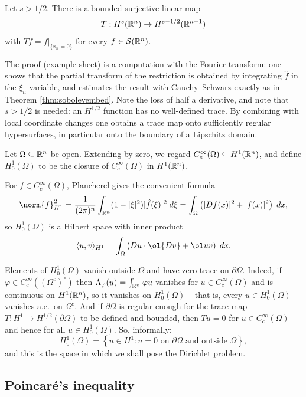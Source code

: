 \documentclass[a4paper]{scrartcl}
\newcommand{\ip}[2]{\langle #1, #2 \rangle}
\newcommand{\Sch}{\mathcal{S}}
\begin{document}
\begin{theorem}\label{thm:trace}
	Let $s>1/2$. There is a bounded surjective linear map
	$$T : H^s(\mathbb{R}^n)\to H^{s-1/2}(\mathbb{R}^{n-1})$$
	with $Tf = f|_{\{x_n=0\}}$ for every $f \in \Sch(\R^n)$.
\end{theorem}

The proof (example sheet) is a computation with the Fourier transform: one shows that the partial transform of the restriction is obtained by integrating $\hat f$ in the $\xi_n$ variable, and estimates the result with Cauchy--Schwarz exactly as in Theorem \ref{thm:sobolevembed}. Note the loss of half a derivative, and note that $s>1/2$ is needed: an $H^{1/2}$ function has no well-defined trace. By combining with local coordinate changes one obtains a trace map onto sufficiently regular hypersurfaces, in particular onto the boundary of a Lipschitz domain.

\begin{definition}
	Let $\Omega\subseteq\mathbb{R}^n$ be open. Extending by zero, we regard $C_c^\infty(\Omega)\subseteq H^1(\mathbb{R}^n)$, and define $H_0^1(\Omega)$ to be the closure of $C_c^\infty(\Omega)$ in $H^1(\mathbb{R}^n)$.
\end{definition}

For $f\in C_c^\infty(\Omega)$, Plancherel gives the convenient formula
$$\norm{f}_{H^1}^2=\frac{1}{(2\pi)^n}\int_{\R^n}(1+|\xi|^2)|\hat f(\xi)|^2\dd\xi=\int_\Omega\left(|Df(x)|^2+|f(x)|^2\right)\dd x,$$
so $H_0^1(\Omega)$ is a Hilbert space with inner product
$$\ip{u}{v}_{H^1}=\int_\Omega \left(Du\cdot \ol{Dv}+\ol uv\right)\dd x.$$

Elements of $H_0^1(\Omega)$ vanish outside $\Omega$ and have zero trace on $\partial\Omega$. Indeed, if $\varphi\in C_c^\infty((\Omega^c)^\circ)$ then $\Lambda_\varphi(u)=\int_{\mathbb{R}^n}\varphi u$ vanishes for $u \in C_c^\infty(\Omega)$ and is continuous on $H^1(\mathbb{R}^n)$, so it vanishes on $H_0^1(\Omega)$ -- that is, every $u \in H_0^1(\Omega)$ vanishes a.e.\ on $\Omega^c$. And if $\partial\Omega$ is regular enough for the trace map $T : H^1 \to H^{1/2}(\partial\Omega)$ to be defined and bounded, then $Tu = 0$ for $u \in C_c^\infty(\Omega)$ and hence for all $u \in H_0^1(\Omega)$. So, informally:
$$H_0^1(\Omega)=\left\{ u \in H^1 : u = 0 \text{ on } \partial\Omega \text{ and outside }\Omega\right\},$$
and this is the space in which we shall pose the Dirichlet problem.

\subsection{Poincar\'e's inequality}
\end{document}
